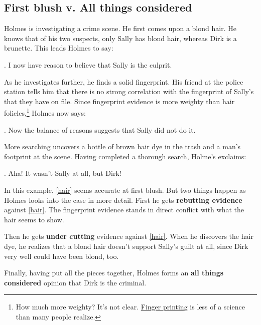 \documentclass[10pt]{article}
\begin{document}
\subsection{First blush v. All things considered}

Holmes is investigating a crime scene. He first comes upon a blond hair. He knows that of his two suspects, only Sally has blond hair, whereas Dirk is a brunette.  This leads Holmes to say:

\ex. I now have reason to believe that Sally is the culprit.\label{hair}

As he investigates further, he finds a solid fingerprint.  His friend at the police station tells him that there is no strong correlation with the fingerprint of Sally's that they have on file.  Since fingerprint evidence is more weighty than hair folicles,\footnote{How much more weighty? It's not clear.  \href{http://en.wikipedia.org/wiki/Finger_Printing\#Validity}{Finger printing} is less of a science than many people realize.} Holmes now says:

\ex. Now the balance of reasons suggests that Sally did not do it.

More searching uncovers a bottle of brown hair dye in the trash and a man's footprint at the scene. Having completed a thorough search, Holme's exclaims:

\ex. Aha! It wasn't Sally at all, but Dirk!

In this example, \ref{hair} seems accurate at first blush.  But two things happen as Holmes looks into the case in more detail.  First he gets \textbf{rebutting evidence} against \ref{hair}.  The fingerprint evidence stands in direct conflict with what the hair seems to show.

Then he gets \textbf{under cutting} evidence against \ref{hair}. When he discovers the hair dye, he realizes that a blond hair doesn't support Sally's guilt at all, since Dirk very well could have been blond, too.

Finally, having put all the pieces together, Holmes forms an \textbf{all things considered} opinion that Dirk is the criminal.
\end{document}
